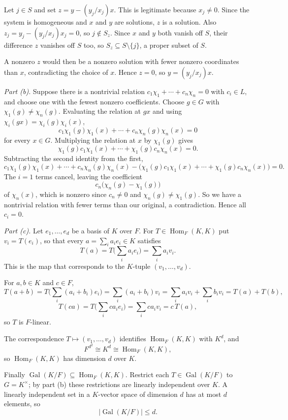 \documentclass[11pt]{article}
\begin{document}
Let $j\in S$ and set $z=y-(y_j/x_j)x$. This is legitimate because $x_j\neq0$. Since the system is homogeneous and $x$ and $y$ are solutions, $z$ is a solution. Also $z_j=y_j-(y_j/x_j)x_j=0$, so $j\notin S_z$. Since $x$ and $y$ both vanish off $S$, their difference $z$ vanishes off $S$ too, so $S_z\subseteq S\setminus\{j\}$, a proper subset of $S$.

A nonzero $z$ would then be a nonzero solution with fewer nonzero coordinates than $x$, contradicting the choice of $x$. Hence $z=0$, so $y=(y_j/x_j)x$.

\emph{Part (b).} Suppose there is a nontrivial relation $c_1\chi_1+\cdots+c_n\chi_n=0$ with $c_i\in L$, and choose one with the fewest nonzero coefficients. Choose $g\in G$ with $\chi_1(g)\neq\chi_n(g)$. Evaluating the relation at $gx$ and using $\chi_i(gx)=\chi_i(g)\chi_i(x)$,
\[
c_1\chi_1(g)\chi_1(x)+\cdots+c_n\chi_n(g)\chi_n(x)=0
\]
for every $x\in G$. Multiplying the relation at $x$ by $\chi_1(g)$ gives
\[
\chi_1(g)c_1\chi_1(x)+\cdots+\chi_1(g)c_n\chi_n(x)=0.
\]
Subtracting the second identity from the first,
\[
c_1\chi_1(g)\chi_1(x)+\cdots+c_n\chi_n(g)\chi_n(x)
-\bigl(\chi_1(g)c_1\chi_1(x)+\cdots+\chi_1(g)c_n\chi_n(x)\bigr)=0 .
\]
The $i=1$ terms cancel, leaving the coefficient
\[
c_n\bigl(\chi_n(g)-\chi_1(g)\bigr)
\]
of $\chi_n(x)$, which is nonzero since $c_n\neq0$ and $\chi_n(g)\neq\chi_1(g)$. So we have a nontrivial relation with fewer terms than our original, a contradiction. Hence all $c_i=0$.

\emph{Part (c).} Let $e_1,\dots,e_d$ be a basis of $K$ over $F$. For $T\in\operatorname{Hom}_F(K,K)$ put $v_i=T(e_i)$, so that every $a=\sum_i a_i e_i\in K$ satisfies
\[
T(a)=T\Big(\sum_i a_i e_i\Big)=\sum_i a_i v_i .
\]
This is the map that corresponds to the $K$-tuple $(v_1,\dots,v_d)$.

For $a,b\in K$ and $c\in F$,
\[
T(a+b)=T\Big(\sum_i (a_i+b_i)e_i\Big)=\sum_i (a_i+b_i)v_i=\sum_i a_i v_i+\sum_i b_i v_i=T(a)+T(b),
\]
\[
T(ca)=T\Big(\sum_i c a_i e_i\Big)=\sum_i c a_i v_i=c\,T(a),
\]
so $T$ is $F$-linear.

The correspondence $T\mapsto(v_1,\dots,v_d)$ identifies $\operatorname{Hom}_F(K,K)$ with $K^d$, and
\[
F^{d^2}\cong K^d\cong\operatorname{Hom}_F(K,K),
\]
so $\operatorname{Hom}_F(K,K)$ has dimension $d$ over $K$.

Finally $\operatorname{Gal}(K/F)\subseteq\operatorname{Hom}_F(K,K)$. Restrict each $T\in\operatorname{Gal}(K/F)$ to $G=K^\times$; by part (b) these restrictions are linearly independent over $K$. A linearly independent set in a $K$-vector space of dimension $d$ has at most $d$ elements, so
\[
|\operatorname{Gal}(K/F)|\le d .
\]
\end{document}
